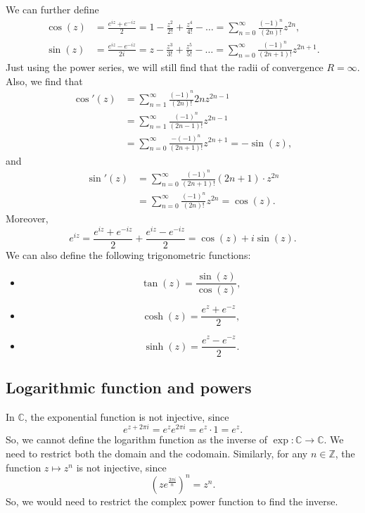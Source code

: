 \documentclass[a4paper, openany]{memoir}
\theoremstyle{definition}
\theoremstyle{plain}
\begin{document}
We can further define
\begin{align*}
    \cos (z) &= \frac{e^{iz} + e^{-iz}}{2} = 1 - \frac{z^2}{2!} + \frac{z^4}{4!} - \dots = \sum_{n=0}^{\infty} \frac{(-1)^n}{(2n)!} z^{2n}, \\
    \sin (z) &= \frac{e^{iz} - e^{-iz}}{2i} = z - \frac{z^3}{3!} + \frac{z^5}{5!} - \dots = \sum_{n=0}^{\infty} \frac{(-1)^n}{(2n+1)!} z^{2n+1}.
\end{align*}
Just using the power series, we will still find that the radii of convergence $R = \infty$. Also, we find that
\begin{align*}
    \cos'(z) &= \sum_{n=1}^{\infty} \frac{(-1)^n}{(2n)!} 2n z^{2n-1} \\
    &= \sum_{n=1}^{\infty} \frac{(-1)^n}{(2n-1)!} z^{2n-1} \\
    &= \sum_{n=0}^{\infty} \frac{-(-1)^n}{(2n+1)!} z^{2n+1} = -\sin(z),
\end{align*}
and
\begin{align*}
    \sin'(z) &= \sum_{n=0}^{\infty} \frac{(-1)^n}{(2n+1)!} (2n+1) \cdot z^{2n} \\
    &= \sum_{n=0}^{\infty} \frac{(-1)^n}{(2n)!} z^{2n} = \cos (z).
\end{align*}
Moreover,
\[e^{iz} = \frac{e^{iz} + e^{-iz}}{2} + \frac{e^{iz} - e^{-iz}}{2} = \cos (z) + i \sin (z).\]
We can also define the following trigonometric functions:
\begin{itemize}
    \item \[\tan (z) = \frac{\sin (z)}{\cos (z)},\]
    \item \[\cosh (z) = \frac{e^z + e^{-z}}{2},\]
    \item \[\sinh (z) = \frac{e^z - e^{-z}}{2}.\]
\end{itemize}

\subsection{Logarithmic function and powers}
In $\mathbb{C}$, the exponential function is not injective, since 
\[e^{z + 2\pi i} = e^z e^{2\pi i} = e^z \cdot 1 = e^z.\]
So, we cannot define the logarithm function as the inverse of $\exp: \mathbb{C} \to \mathbb{C}$. We need to restrict both the domain and the codomain. Similarly, for any $n \in \mathbb{Z}$, the function $z \mapsto z^n$ is not injective, since
\[(z e^{\frac{2\pi i}{n}})^n = z^n.\]
So, we would need to restrict the complex power function to find the inverse. 
\end{document}
